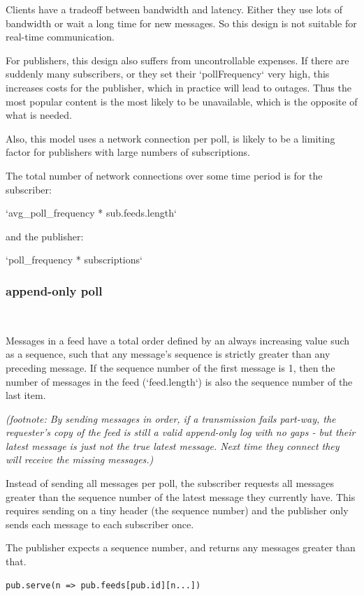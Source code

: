 \documentclass[sigconf]{acmart}
\begin{document}
Clients have a tradeoff between bandwidth and latency. Either they use
lots of bandwidth or wait a long time for new messages. So this design
is not suitable for real-time communication.

For publishers, this design also suffers from uncontrollable
expenses. If there are suddenly many subscribers, or they set their
`pollFrequency` very high, this increases costs for the publisher,
which in practice will lead to outages. Thus the most popular content
is the most likely to be unavailable, which is the opposite of what is
needed.

Also, this model uses a network connection per poll, is likely to be a
limiting factor for publishers with large numbers of subscriptions.

The total number of network connections over some time period is for
the subscriber:

`avg\_poll\_frequency * sub.feeds.length`

and the publisher:

`poll\_frequency * subscriptions`

\subsubsection{append-only poll}\ \\ \vspace{-1em}

Messages in a feed have a total order defined by an always increasing
value such as a sequence, such that any message's sequence is strictly
greater than any preceding message. If the sequence number of the
first message is 1, then the number of messages in the feed
(`feed.length`) is also the sequence number of the last item.

{\em (footnote: By sending messages in order, if a transmission fails
  part-way, the requester's copy of the feed is still a valid
  append-only log with no gaps - but their latest message is just not
  the true latest message. Next time they connect they will receive
  the missing messages.)}

Instead of sending all messages per poll, the subscriber requests all
messages greater than the sequence number of the latest message they
currently have.  This requires sending on a tiny header (the sequence
number) and the publisher only sends each message to each subscriber
once.

The publisher expects a sequence number, and returns any messages
greater than that.
\begin{verbatim}
pub.serve(n => pub.feeds[pub.id][n...])
\end{verbatim}
\end{document}
